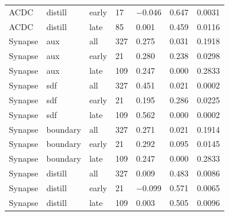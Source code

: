 \begin{longtable}{lllllll}
ACDC & distill & early & 17 & $-$0.046 & 0.647 & 0.0031 \\
ACDC & distill & late & 85 & 0.001 & 0.459 & 0.0116 \\
Synapse & aux & all & 327 & 0.275 & 0.031 & 0.1918 \\
Synapse & aux & early & 21 & 0.280 & 0.238 & 0.0298 \\
Synapse & aux & late & 109 & 0.247 & 0.000 & 0.2833 \\
Synapse & sdf & all & 327 & 0.451 & 0.021 & 0.0002 \\
Synapse & sdf & early & 21 & 0.195 & 0.286 & 0.0225 \\
Synapse & sdf & late & 109 & 0.562 & 0.000 & 0.0002 \\
Synapse & boundary & all & 327 & 0.271 & 0.021 & 0.1914 \\
Synapse & boundary & early & 21 & 0.292 & 0.095 & 0.0145 \\
Synapse & boundary & late & 109 & 0.247 & 0.000 & 0.2833 \\
Synapse & distill & all & 327 & 0.009 & 0.483 & 0.0086 \\
Synapse & distill & early & 21 & $-$0.099 & 0.571 & 0.0065 \\
Synapse & distill & late & 109 & 0.003 & 0.505 & 0.0096 \\
\bottomrule
\end{longtable}
